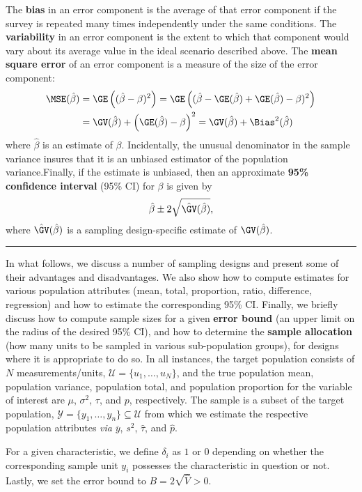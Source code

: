 The \textbf{bias} in an error component is the average of that error component if the survey is repeated many times independently under the same conditions. The \textbf{variability} in an error component is the extent to which that component would vary about its average value in the ideal scenario described above. The \textbf{mean square error} of an error component is a measure of the size of the error component:
\begin{align*}
\MSE(\hat{\beta})&=\GE\left((\hat{\beta}-\beta)^2\right)=\GE\left((\hat{\beta}-\GE(\hat{\beta})+\GE(\hat{\beta})-\beta)^2\right)\\&=\GV(\hat{\beta})+\left(\GE(\hat{\beta})-\beta\right)^2=\GV(\hat{\beta})+\Bias^2(\hat{\beta}) \end{align*}
where $\hat{\beta}$ is an estimate of $\beta$. Incidentally, the unusual denominator in the sample variance insures that it is an unbiased estimator of the population variance.\newl Finally, if the estimate is unbiased, then an approximate \textbf{95\% confidence interval} (95\% CI) for $\beta$ is given by $$\hat{\beta}\pm 2\sqrt{\hat{\GV}(\hat{\beta})},$$ where $\hat{\GV}(\hat{\beta})$ is a sampling design-specific estimate of $\GV(\hat{\beta})$.
\begin{center}
    \rule{0.5\textwidth}{.4pt}
\end{center}
In what follows, we discuss a number of sampling designs and present some of their advantages and disadvantages. We also show how to compute estimates for various population attributes (mean, total, proportion, ratio, difference, regression) and how to estimate the corresponding 95\% CI. Finally, we briefly discuss how to compute sample sizes for a given \textbf{error bound} (an upper limit on the radius of the desired 95\% CI), and how to determine the \textbf{sample allocation} (how many units to be sampled in various sub-population groups), for designs where it is appropriate to do so. \newl 
In all instances, the target population consists of $N$ measurements/units, $\mathcal{U}=\{u_1,\ldots,u_N\}$, and the true population mean, population variance, population total, and population proportion for the variable of interest are $\mu$, $\sigma^2$, $\tau$, and $p$, respectively. The sample is a subset of the target population, $\mathcal{Y}=\{y_1,\ldots,y_n\}\subseteq \mathcal{U}$ from which we estimate the respective population attributes \textit{via} $\overline{y}$, $s^2$, $\hat{\tau}$, and $\hat{p}$. \par For a given characteristic, we define $\delta_i$ as $1$ or $0$ depending on whether the corresponding sample unit $y_i$ possesses the characteristic in question or not. Lastly, we set the error bound to $B=2\sqrt{\hat{V}}>0$.\newpage\noindent 
